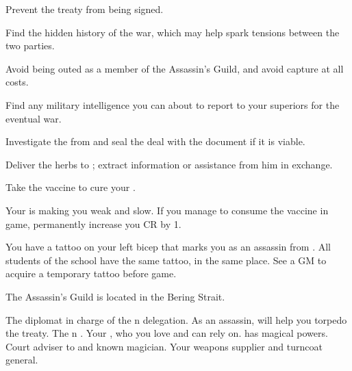 \documentclass[char]{NeptuneBall}
\begin{document}
\begin{itemz}[Goals]
	\item Prevent the treaty from being signed.
	\item Find the hidden history of the war, which may help spark tensions between the two parties.
	\item Avoid being outed as a member of the Assassin's Guild, and avoid capture at all costs.
  \item Find any military intelligence you can about \pAtlantis{} to report to your superiors for the eventual war.
	\item Investigate the \iPrototype{} from \cGeneral{} and seal the deal with the \iBattlePlan{} document if it is viable.
	\item Deliver the herbs to \cManta{}; extract information or assistance from him in exchange.
	\item Take the vaccine to cure your \pPolio{}.
\end{itemz}

\begin{itemz}[Notes]
  \item Your \pPolio{} is making you weak and slow. If you manage to consume the vaccine in game, permanently increase you CR by 1.
	\item You have a tattoo on your left bicep that marks you as an assassin from \pAssassin{}. All students of the school have the same tattoo, in the same place. See a GM to acquire a temporary tattoo before game.
\end{itemz}

\begin{itemz}[Trivia]
  \item The Assassin's Guild is located in the Bering Strait.
\end{itemz}

\begin{contacts}
	\contact{\cDiplomat{}} The diplomat in charge of the \pPacifica{}n delegation. As an assassin, \cDiplomat{\they} will help you torpedo the treaty.
	\contact{\cPrince{}} The \pPacifica{}n \cPrince{\Prince}.
  \contact{\cBodyguard{}} Your \cSpy{\sibling}, who you love and can rely on. \cBodyguard{\They} has magical powers.
	\contact{\cManta{}} Court adviser to \cKing{\King} \cKing{} and known magician.
	\contact{\cGeneral{}} Your weapons supplier and turncoat general.
\end{contacts}
\end{document}
